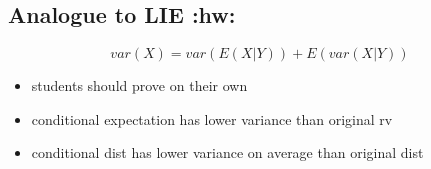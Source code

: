 \subsection{Analogue to LIE \textbf{:hw:}}
\label{sec-4-3}

     \[var(X) = var(E(X|Y)) + E(var(X|Y))\]
\begin{itemize}
\item students should prove on their own
\item conditional expectation has lower variance than original rv
\item conditional dist has lower variance on average than original
         dist
\end{itemize}
         
